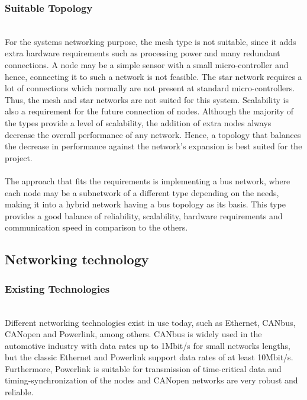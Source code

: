 \subsubsection{Suitable Topology}~\\
For the systems networking purpose, the mesh type is not suitable, since it adds extra hardware requirements such as processing power and many redundant connections.
A node may be a simple sensor with a small micro-controller and hence, connecting it to such a network is not feasible.
The star network requires a lot of connections which normally are not present at standard micro-controllers.
Thus, the mesh and star networks are not suited for this system.
Scalability is also a requirement for the future connection of nodes.
Although the majority of the types provide a level of scalability, the addition of extra nodes always decrease the overall performance of any network.
Hence, a topology that balances the decrease in performance against the network's expansion is best suited for the project.\\\\
The approach that fits the requirements is implementing a bus network, where each node may be a subnetwork of a different type depending on the needs, making it into a hybrid network having a bus topology as its basis.
This type provides a good balance of reliability, scalability, hardware requirements and communication speed in comparison to the others.
\subsection{Networking technology}

\subsubsection{Existing Technologies}~\\
Different networking technologies exist in use today, such as Ethernet, CANbus, CANopen and Powerlink, among others.
CANbus is widely used in the automotive industry with data rates up to 1Mbit/s for small networks lengths, but the classic Ethernet and Powerlink support data rates of at least 10Mbit/s.
Furthermore, Powerlink is suitable for transmission of time-critical data and timing-synchronization of the nodes and CANopen networks are very robust and reliable.


